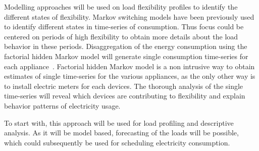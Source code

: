 \documentclass[fleqn,a4paper,twoside,10pt]{article}
\begin{document}
 	Modelling approaches will be used on load flexibility profiles to identify the different states of flexibility. Markov switching models have been previously used to identify different states in time-series of consumption. Thus focus could be centered on periods of high flexibility to obtain more details about the load behavior in these periods. Disaggregation of the energy consumption using the factorial hidden Markov model will generate single consumption time-series for each appliance~\cite{kolter2011}. Factorial hidden Markov model is a non intrusive way to obtain estimates of single time-series for the various appliances, as the only other way is to install electric meters for each devices. The thorough analysis of the single time-series will reveal which devices are contributing to flexibility and explain behavior patterns of electricity usage.

 	To start with, this approach will be used for load profiling and descriptive analysis. As it will be model based, forecasting of the loads will be possible, which could subsequently be used for scheduling electricity consumption.

	


\end{document}
